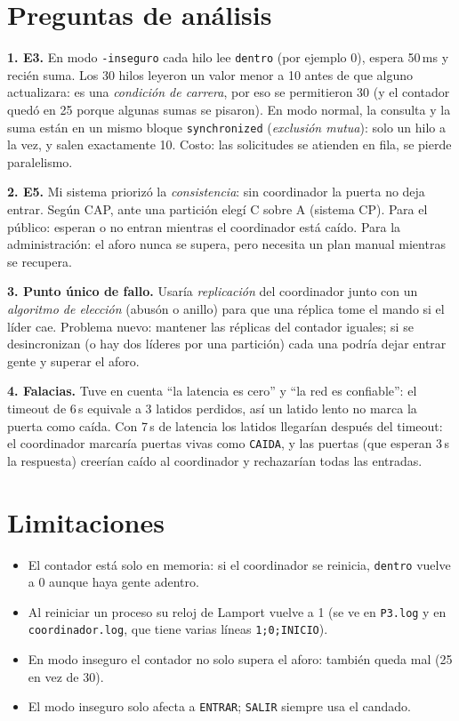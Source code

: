 \documentclass[11pt,a4paper]{article}
\begin{document}
\section{Preguntas de análisis}
\textbf{1. E3.} En modo \texttt{-inseguro} cada hilo lee \texttt{dentro} (por ejemplo 0), espera 50\,ms y recién suma. Los 30 hilos leyeron un valor menor a 10 antes de que alguno actualizara: es una \emph{condición de carrera}, por eso se permitieron 30 (y el contador quedó en 25 porque algunas sumas se pisaron). En modo normal, la consulta y la suma están en un mismo bloque \texttt{synchronized} (\emph{exclusión mutua}): solo un hilo a la vez, y salen exactamente 10. Costo: las solicitudes se atienden en fila, se pierde paralelismo.

\textbf{2. E5.} Mi sistema priorizó la \emph{consistencia}: sin coordinador la puerta no deja entrar. Según CAP, ante una partición elegí C sobre A (sistema CP). Para el público: esperan o no entran mientras el coordinador está caído. Para la administración: el aforo nunca se supera, pero necesita un plan manual mientras se recupera.

\textbf{3. Punto único de fallo.} Usaría \emph{replicación} del coordinador junto con un \emph{algoritmo de elección} (abusón o anillo) para que una réplica tome el mando si el líder cae. Problema nuevo: mantener las réplicas del contador iguales; si se desincronizan (o hay dos líderes por una partición) cada una podría dejar entrar gente y superar el aforo.

\textbf{4. Falacias.} Tuve en cuenta ``la latencia es cero'' y ``la red es confiable'': el timeout de 6\,s equivale a 3 latidos perdidos, así un latido lento no marca la puerta como caída. Con 7\,s de latencia los latidos llegarían después del timeout: el coordinador marcaría puertas vivas como \texttt{CAIDA}, y las puertas (que esperan 3\,s la respuesta) creerían caído al coordinador y rechazarían todas las entradas.

\section{Limitaciones}
\begin{itemize}
\item El contador está solo en memoria: si el coordinador se reinicia, \texttt{dentro} vuelve a 0 aunque haya gente adentro.
\item Al reiniciar un proceso su reloj de Lamport vuelve a 1 (se ve en \texttt{P3.log} y en \texttt{coordinador.log}, que tiene varias líneas \texttt{1;0;INICIO}).
\item En modo inseguro el contador no solo supera el aforo: también queda mal (25 en vez de 30).
\item El modo inseguro solo afecta a \texttt{ENTRAR}; \texttt{SALIR} siempre usa el candado.
\end{itemize}
\end{document}
